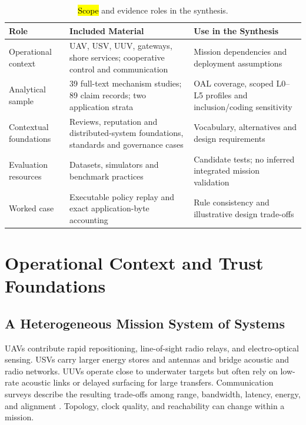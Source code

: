 \documentclass[blockchains,review,accept,moreauthors]{Definitions/mdpi}
\begin{document}
\begin{table}[H]
\caption{\hl{Scope} %
 and evidence roles in the synthesis.\label{tab:scope}}
\begin{tabularx}{\textwidth}{LLL}
\toprule
\textbf{Role} & \textbf{Included Material} & \textbf{Use in the Synthesis}\\
\midrule
Operational context & UAV, USV, UUV, gateways, shore services; cooperative control and communication & Mission dependencies and deployment assumptions\\
Analytical sample & 39 full-text mechanism studies; 89 claim records; two application strata & OAL coverage, scoped L0--L5 profiles and inclusion/coding sensitivity\\
Contextual foundations & Reviews, reputation and distributed-system foundations, standards and governance cases & Vocabulary, alternatives and design requirements\\
Evaluation resources & Datasets, simulators and benchmark practices & Candidate tests; no inferred integrated mission validation\\
Worked case & Executable policy replay and exact application-byte accounting & Rule consistency and illustrative design trade-offs\\
\bottomrule
\end{tabularx}
\end{table}


\section{Operational Context and Trust Foundations}

\subsection{A Heterogeneous Mission System of Systems}\label{sec:coalition}

UAVs contribute rapid repositioning, line-of-sight radio relays, and electro-optical sensing. USVs carry larger energy stores and antennas and bridge acoustic and radio networks. UUVs operate close to underwater targets but often rely on low-rate acoustic links or delayed surfacing for large transfers. Communication surveys describe the resulting trade-offs among range, bandwidth, latency, energy, and alignment \citep{nomikos2023survey,ali2020recent,saeed2019underwater,jahanbakht2021internet}. Topology, clock quality, and reachability can change within a mission.
\end{document}
